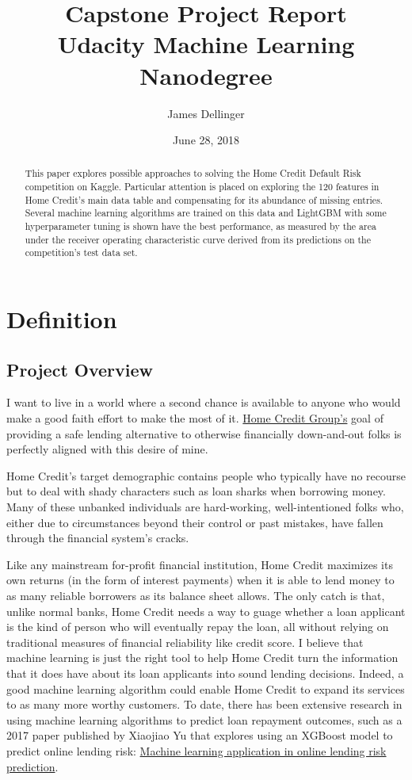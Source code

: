 \documentclass[12pt, letterpaper]{article}
\title{Capstone Project Report\\[8pt]
\normalsize{Udacity Machine Learning Nanodegree}}
\date{June 28, 2018}
\author{James Dellinger}
\begin{document}
\maketitle

\begin{abstract}
This paper explores possible approaches to solving the Home Credit Default Risk competition on Kaggle. Particular attention is placed on exploring the 120 features in Home Credit's main data table and compensating for its abundance of missing entries. Several machine learning algorithms are trained on this data and LightGBM with some hyperparameter tuning is shown have the best performance, as measured by the area under the receiver operating characteristic curve derived from its predictions on the competition's test data set.
\end{abstract}

\section{Definition}
\subsection{Project Overview}
I want to live in a world where a second chance is available to anyone who would make a good faith effort to make the most of it. \href{http://www.homecredit.net}{Home Credit Group’s}\cite{homecreditwebsite} goal of providing a safe lending alternative to otherwise financially down-and-out folks is perfectly aligned with this desire of mine.

Home Credit's target demographic contains people who typically have no recourse but to deal with shady characters such as loan sharks when borrowing money. Many of these unbanked individuals are hard-working, well-intentioned folks who, either due to circumstances beyond their control or past mistakes, have fallen through the financial system’s cracks.

Like any mainstream for-profit financial institution, Home Credit maximizes its own returns (in the form of interest payments) when it is able to lend money to as many reliable borrowers as its balance sheet allows. The only catch is that, unlike normal banks, Home Credit needs a way to guage whether a loan applicant is the kind of person who will eventually repay the loan, all without relying on traditional measures of financial reliability like credit score. I believe that machine learning is just the right tool to help Home Credit turn the information that it does have about its loan applicants into sound lending decisions. Indeed, a good machine learning algorithm could enable Home Credit to expand its services to as many more worthy customers. To date, there has been extensive research in using machine learning algorithms to predict loan repayment outcomes, such as a 2017 paper published by Xiaojiao Yu that explores using an XGBoost model to predict online lending risk: \href{https://arxiv.org/abs/1707.04831}{Machine learning application in online lending risk prediction}\cite{2017arXiv170704831Y}.
\end{document}
